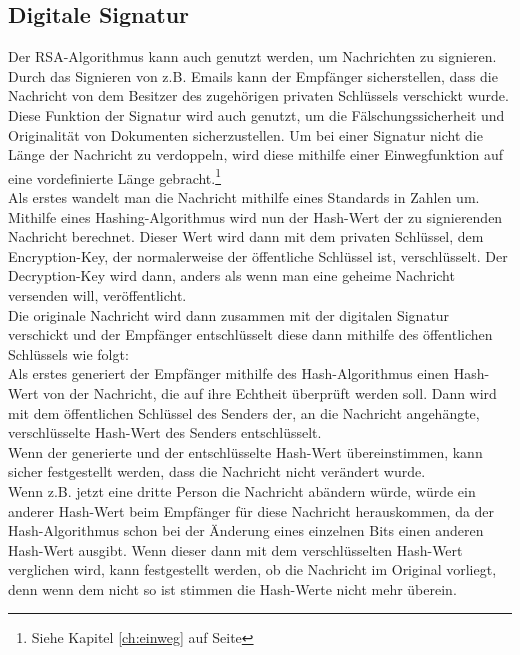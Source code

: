 \documentclass[12pt,a4paper]{scrartcl}
\begin{document}
	\subsection{Digitale Signatur}
	Der RSA-Algorithmus kann auch genutzt werden, um Nachrichten zu signieren. Durch das Signieren von z.B. Emails kann der Empfänger sicherstellen, dass die Nachricht von dem Besitzer des zugehörigen privaten Schlüssels verschickt wurde. Diese Funktion der Signatur wird auch genutzt, um die Fälschungssicherheit und Originalität von  Dokumenten sicherzustellen. Um bei einer Signatur nicht die Länge der Nachricht zu verdoppeln, wird diese mithilfe einer Einwegfunktion auf eine vordefinierte Länge gebracht.\footnote{Siehe Kapitel \ref{ch:einweg} auf Seite \pageref{ch:einweg}}\\

Als erstes wandelt man die Nachricht mithilfe eines Standards in Zahlen um. Mithilfe eines Hashing-Algorithmus wird nun der Hash-Wert der zu signierenden Nachricht berechnet. Dieser Wert wird dann mit dem privaten Schlüssel, dem Encryption-Key, der normalerweise der öffentliche Schlüssel ist, verschlüsselt. %
	Der Decryption-Key wird dann, anders als wenn man eine geheime Nachricht versenden will, veröffentlicht.\\
	Die originale Nachricht wird dann zusammen mit der digitalen Signatur verschickt und der Empfänger entschlüsselt diese dann mithilfe des öffentlichen Schlüssels wie folgt:\\
	Als erstes generiert der Empfänger mithilfe des Hash-Algorithmus einen Hash-Wert von der Nachricht, die auf ihre Echtheit überprüft werden soll. Dann wird mit dem öffentlichen Schlüssel des Senders der, an die Nachricht angehängte, verschlüsselte Hash-Wert des Senders entschlüsselt. \\
Wenn der generierte und der entschlüsselte Hash-Wert übereinstimmen, kann sicher festgestellt werden, dass die Nachricht nicht verändert wurde. \\
Wenn z.B. jetzt eine dritte Person die Nachricht abändern würde, würde ein anderer Hash-Wert beim Empfänger für diese Nachricht herauskommen, da der Hash-Algorithmus schon bei der Änderung eines einzelnen Bits einen anderen Hash-Wert ausgibt. Wenn dieser dann mit dem verschlüsselten Hash-Wert verglichen wird, kann festgestellt werden, ob die Nachricht im Original vorliegt, denn wenn dem nicht so ist stimmen die Hash-Werte nicht mehr überein.\\


\end{document}
